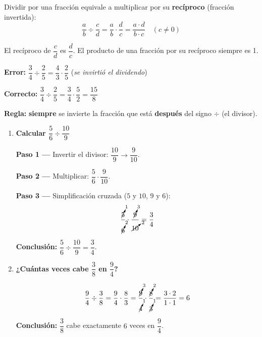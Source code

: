 \documentclass[11pt, letterpaper]{article}
\begin{document}
\begin{tcolorbox}[importantbox, title={Divisi\'on de fracciones}]
Dividir por una fracci\'on equivale a multiplicar por su \textbf{rec\'iproco} (fracci\'on invertida):
$$\frac{a}{b} \div \frac{c}{d} = \frac{a}{b} \cdot \frac{d}{c} = \frac{a \cdot d}{b \cdot c} \quad (c \neq 0)$$

El rec\'iproco de $\dfrac{c}{d}$ es $\dfrac{d}{c}$. El producto de una fracci\'on por su rec\'iproco siempre es 1.
\end{tcolorbox}

\begin{tcolorbox}[warningbox, title={Error frecuente --- invertir el dividendo en lugar del divisor}]
\noindent\textbf{Error:} $\dfrac{3}{4} \div \dfrac{2}{5} = \dfrac{4}{3} \cdot \dfrac{2}{5}$ \quad (\textit{se invirti\'o el dividendo})

\medskip

\noindent\textbf{Correcto:} $\dfrac{3}{4} \div \dfrac{2}{5} = \dfrac{3}{4} \cdot \dfrac{5}{2} = \dfrac{15}{8}$

\medskip

\noindent\textbf{Regla:} \textbf{siempre} se invierte la fracci\'on que est\'a \textbf{despu\'es} del signo $\div$ (el divisor).
\end{tcolorbox}

\begin{tcolorbox}[examplebox, title={Ejemplos --- divisi\'on de fracciones}]
\begin{enumerate}[label=\textbf{Ej. \arabic*.}, leftmargin=*, itemsep=12pt]

\item \textbf{Calcular $\dfrac{5}{6} \div \dfrac{10}{9}$}

\textbf{Paso 1 ---} Invertir el divisor: $\dfrac{10}{9} \to \dfrac{9}{10}$.

\textbf{Paso 2 ---} Multiplicar: $\dfrac{5}{6} \cdot \dfrac{9}{10}$.

\textbf{Paso 3 ---} Simplificaci\'on cruzada ($5$ y $10$, $9$ y $6$):
$$\frac{\cancelto{1}{5}}{\cancelto{2}{6}} \cdot \frac{\cancelto{3}{9}}{\cancelto{2}{10}} = \frac{3}{4}$$

\textbf{Conclusi\'on:} $\dfrac{5}{6} \div \dfrac{10}{9} = \dfrac{3}{4}$. \checkmark

\item \textbf{¿Cu\'antas veces cabe $\dfrac{3}{8}$ en $\dfrac{9}{4}$?}

$$\frac{9}{4} \div \frac{3}{8} = \frac{9}{4} \cdot \frac{8}{3} = \frac{\cancelto{3}{9}}{\cancelto{1}{4}} \cdot \frac{\cancelto{2}{8}}{\cancelto{1}{3}} = \frac{3 \cdot 2}{1 \cdot 1} = 6$$

\textbf{Conclusi\'on:} $\dfrac{3}{8}$ cabe exactamente $6$ veces en $\dfrac{9}{4}$. \checkmark

\end{enumerate}
\end{tcolorbox}
\end{document}

